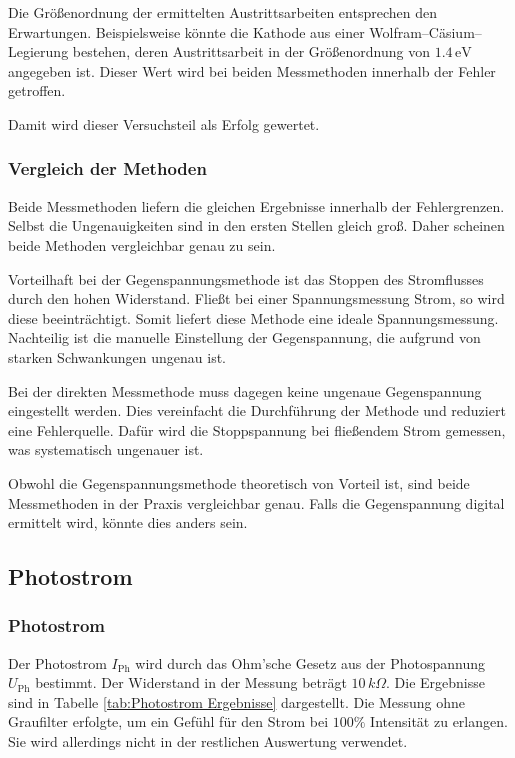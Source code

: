 \documentclass[12pt,a4paper]{scrartcl}
\numberwithin{equation}{section} %
\begin{document}
Die Größenordnung der ermittelten Austrittsarbeiten entsprechen den Erwartungen. Beispielsweise könnte die Kathode aus einer Wolfram--Cäsium--Legierung bestehen, deren Austrittsarbeit in der Größenordnung von $1.4\mathrm{\,eV}$ \cite{Demtröder} angegeben ist. Dieser Wert wird bei beiden Messmethoden innerhalb der Fehler getroffen.

Damit wird dieser Versuchsteil als Erfolg gewertet.

\subsubsection{Vergleich der Methoden}
Beide Messmethoden liefern die gleichen Ergebnisse innerhalb der Fehlergrenzen. Selbst die Ungenauigkeiten sind in den ersten Stellen gleich groß. Daher scheinen beide Methoden vergleichbar genau zu sein.

Vorteilhaft bei der Gegenspannungsmethode ist das Stoppen des Stromflusses durch den hohen Widerstand. Fließt bei einer Spannungsmessung Strom, so wird diese beeinträchtigt. Somit liefert diese Methode eine ideale Spannungsmessung. Nachteilig ist die manuelle Einstellung der Gegenspannung, die aufgrund von starken Schwankungen ungenau ist.

Bei der direkten Messmethode muss dagegen keine ungenaue Gegenspannung eingestellt werden. Dies vereinfacht die Durchführung der Methode und reduziert eine Fehlerquelle. Dafür wird die Stoppspannung bei fließendem Strom gemessen, was systematisch ungenauer ist.

Obwohl die Gegenspannungsmethode theoretisch von Vorteil ist, sind beide Messmethoden in der Praxis vergleichbar genau. Falls die Gegenspannung digital ermittelt wird, könnte dies anders sein.

\subsection{Photostrom}
\subsubsection{Photostrom}

Der Photostrom $I_\mathrm{Ph}$ wird durch das Ohm'sche Gesetz aus der Photospannung $U_\mathrm{Ph}$ bestimmt. Der Widerstand in der Messung beträgt $10 \,k\Omega$. Die Ergebnisse sind in Tabelle \ref{tab:Photostrom Ergebnisse} dargestellt. Die Messung ohne Graufilter erfolgte, um ein Gefühl für den Strom bei $100\%$ Intensität zu erlangen. Sie wird allerdings nicht in der restlichen Auswertung verwendet.
\end{document}
